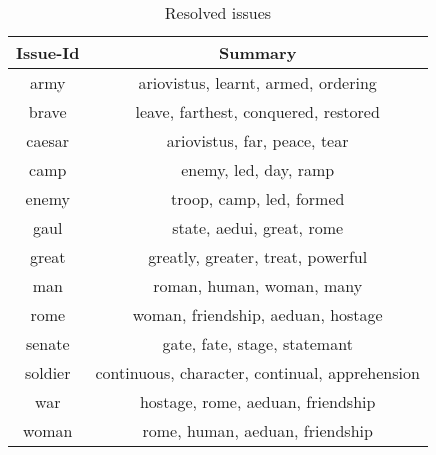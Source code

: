 \begin{table}[ht]
\caption{Resolved issues}
\centering
\begin{tabular}{@{}c c@{}}
	\toprule
	{\bfseries Issue-Id} & {\bfseries Summary} \\
	\midrule
	army & ariovistus, learnt, armed, ordering\\ 
	brave & leave, farthest, conquered, restored\\ 
	caesar & ariovistus, far, peace, tear\\ 
	camp & enemy, led, day, ramp\\ 
	enemy & troop, camp, led, formed\\ 
	gaul & state, aedui, great, rome\\ 
	great & greatly, greater, treat, powerful\\ 
	man & roman, human, woman, many\\ 
	rome & woman, friendship, aeduan, hostage\\ 
	senate & gate, fate, stage, statemant\\ 
	soldier & continuous, character, continual, apprehension\\ 
	war & hostage, rome, aeduan, friendship\\ 
	woman & rome, human, aeduan, friendship\\
	\bottomrule
\end{tabular}
\label{table:nonlin}
\end{table}